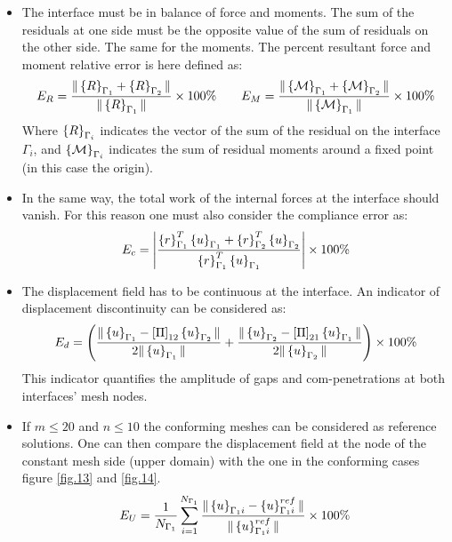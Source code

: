   \begin{itemize}
 \item The interface must be in balance of force and moments. The sum of the residuals at one side must be the opposite value of the sum of residuals on the other side. The same for the moments.
The percent resultant force and moment relative error is here defined as:
 \begin{eqnarray}
 \label{eq.81}
 E_{R}=\frac{\|\left\lbrace{R}\right \rbrace_{\Gamma_1}+\left\lbrace{R}\right \rbrace_{\Gamma_2}\|}{\|\left\lbrace{R}\right \rbrace_{\Gamma_1}\|}\times 100 \% \qquad E_{M}=\frac{\|\left\lbrace{\mathcal{M}}\right \rbrace_{\Gamma_1}+\left\lbrace{\mathcal{M}}\right \rbrace_{\Gamma_2}\|}{\|\left\lbrace{\mathcal{M}}\right \rbrace_{\Gamma_1}\|}\times 100 \%
 \end{eqnarray}
 Where  $\left\lbrace{R}\right \rbrace_{\Gamma_i}$ indicates the vector of the sum of the residual on the interface $\Gamma_i$, and $\left\lbrace{\mathcal{M}}\right \rbrace_{\Gamma_i}$ indicates the sum of residual moments around a fixed point (in this case the origin).
 \item In the same way, the total work of the internal forces at the interface should vanish. For this reason one must also consider the compliance error as:
 \begin{eqnarray}
 \label{eq.82}
 E_{c}=\left|\frac{\left\lbrace{r}\right \rbrace_{\Gamma_1}^T\left\lbrace{u}\right \rbrace_{\Gamma_1}+\left\lbrace{r}\right \rbrace_{\Gamma_2}^T\left\lbrace{u}\right \rbrace_{\Gamma_2}}{\left\lbrace{r}\right \rbrace_{\Gamma_1}^T\left\lbrace{u}\right \rbrace_{\Gamma_1}}\right|\times 100 \%
 \end{eqnarray}
 \item The displacement field has to be continuous at the interface. An indicator of displacement discontinuity can be considered as:
 \begin{eqnarray}
 \label{eq.83}
 E_{d}=\left(\frac{\|\left\lbrace{u}\right \rbrace_{\Gamma_1}-\left[{\Pi}\right]_{12}\left\lbrace{u}\right \rbrace_{\Gamma_2}\|}{2\|\left\lbrace{u}\right \rbrace_{\Gamma_1}\|}+\frac{\|\left\lbrace{u}\right \rbrace_{\Gamma_2}-\left[{\Pi}\right]_{21}\left\lbrace{u}\right \rbrace_{\Gamma_1}\|}{2\|\left\lbrace{u}\right \rbrace_{\Gamma_2}\|}\right)\times 100 \%
 \end{eqnarray}
 This indicator quantifies the amplitude of gaps and com-penetrations at both interfaces’ mesh nodes. 
 \item If $m\leq20$ and $n\leq 10$ the conforming meshes can be considered as reference solutions. One can then compare the displacement field at the node of the constant mesh side (upper domain) with the one in the conforming cases figure \ref{fig.13} and \ref{fig.14}.  
 \begin{eqnarray}
 \label{85}
 E_{U}=\frac{1}{N_{\Gamma_1}}\sum_{i=1}^{N_{\Gamma_1}}\frac{\|\VectorVar{u}_{\Gamma_1i}-\VectorVar{u}^{ref}_{\Gamma_1i}\|}{\|\VectorVar{u}^{ref}_{\Gamma_1i}\|}\times 100 \% 

\end{eqnarray}
\end{itemize}
